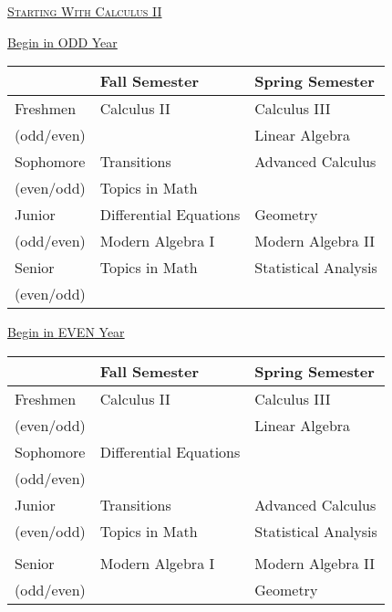 \documentclass[letterpaper,10pt]{article}
\begin{document}
\vspace{0.4in}
\begin{center}
\underline{\scshape  \Large Starting With Calculus II} %
\end{center}

\begin{minipage}[b]{.45\textwidth}
\begin{center}\large  \underline{Begin in {\color{red} ODD} Year}
\end{center}
\begin{tabular}{l|l|l}
	&{\bf Fall Semester} & {\bf Spring Semester}\\
\hline
Freshmen & Calculus II & Calculus III \\
\scriptsize (odd/even) &  & Linear Algebra \\
\hline
Sophomore & Transitions & Advanced Calculus \\
\scriptsize (even/odd)& {\color{gray}Topics in Math} &\\
\hline
Junior & Differential Equations & Geometry \\
\scriptsize (odd/even)& Modern Algebra I & Modern Algebra II\\
\hline
Senior & {\color{gray}Topics in Math} & Statistical Analysis\\
\scriptsize (even/odd)&&
\end{tabular}
\end{minipage}
\hspace{4em}
\begin{minipage}[b]{.45\textwidth}
\begin{center}\large  \underline{Begin in {\color{red} EVEN} Year}
\end{center}
\begin{tabular}{l|l|l}
	&{\bf Fall Semester} & {\bf Spring Semester}\\
\hline
Freshmen & Calculus II & Calculus III \\
\scriptsize (even/odd) &  & Linear Algebra \\
\hline
Sophomore & Differential Equations &  \\
\scriptsize (odd/even)& &\\
\hline
Junior & Transitions & Advanced Calculus\\
\scriptsize (even/odd)&  {\color{gray}Topics in Math} & Statistical Analysis\\
 & & \\
\hline
Senior &  Modern Algebra I & Modern Algebra II \\
\scriptsize (odd/even) && Geometry
\end{tabular}
\end{minipage}
\end{document}
